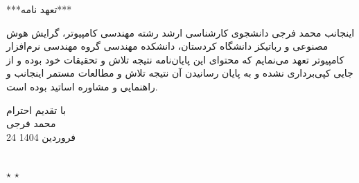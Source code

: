 \thispagestyle{empty}

\begin{center}
	
	
	
\end{center}
\newpage
\BNazF
\thispagestyle{empty}
{
	\baselineskip=0.8cm
	
	\begin{center}
		***تعهد نامه***
		\vspace*{-0.5cm}\\
		
	\end{center}	
	
		اینجانب محمد فرجی دانشجوی کارشناسی ارشد رشته مهندسی کامپیوتر، گرایش هوش مصنوعی و رباتیکز دانشگاه کردستان، دانشکده مهندسی گروه مهندسی نرم‌افزار کامپیوتر تعهد می‌نمایم که محتوای این پایان‌نامه نتیجه تلاش و تحقیقات خود بوده و از جایی کپی‌برداری نشده و به پایان رسانیدن آن نتیجه تلاش و مطالعات مستمر اینجانب و راهنمایی و مشاوره اساتید بوده است. 
	\begin{flushleft}
		با تقدیم احترام‎\\محمد فرجی \\ 24 فروردین 1404 
	\end{flushleft}
	\vspace*{-0.3cm}
	
	
	\newpage
	\thispagestyle{empty}
	\begin{center}
		
		
		\\
		$ \star $ \hspace*{-0.1cm}
		$ \star $ \hspace*{-0.1cm} \\
		\vspace*{-0.2cm}
	\end{center}
	
}
